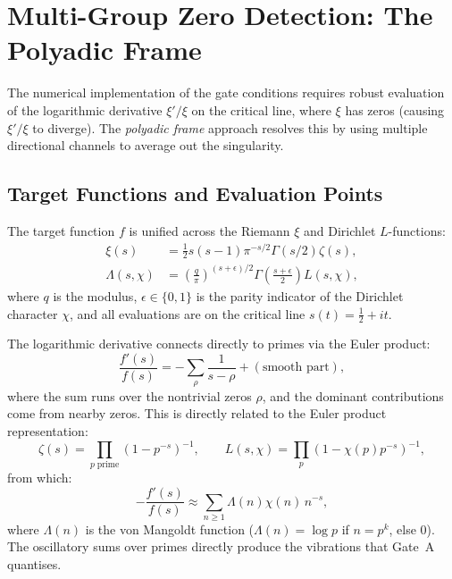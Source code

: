 \documentclass[11pt, a4paper]{article}
\theoremstyle{definition}
\theoremstyle{plain}
\newcommand{\xif}{\xi}                      %
\begin{document}
\section{Multi-Group Zero Detection: The Polyadic Frame}
\label{sec:polyadic}

The numerical implementation of the gate conditions requires robust
evaluation of the logarithmic derivative $\xif'/\xif$ on the critical
line, where $\xif$ has zeros (causing $\xif'/\xif$ to diverge). The
\textit{polyadic frame} approach resolves this by using multiple
directional channels to average out the singularity.

\subsection{Target Functions and Evaluation Points}

The target function $f$ is unified across the Riemann $\xif$ and
Dirichlet $L$-functions:
\begin{align}
  \xif(s) &= \frac{1}{2}s(s-1)\pi^{-s/2}\Gamma(s/2)\zeta(s),
  \label{eq:xi_target}\\
  \Lambda(s, \chi) &= \left(\frac{q}{\pi}\right)^{(s+\epsilon)/2}
  \Gamma\!\left(\frac{s+\epsilon}{2}\right)L(s,\chi),
  \label{eq:lambda_target}
\end{align}
where $q$ is the modulus, $\epsilon \in \{0,1\}$ is the parity indicator
of the Dirichlet character $\chi$, and all evaluations are on the
critical line $s(t) = \tfrac{1}{2} + it$.

The logarithmic derivative connects directly to primes via the Euler
product:
\begin{equation}
  \frac{f'(s)}{f(s)} = -\sum_{\rho}\frac{1}{s-\rho} +
  (\text{smooth part}),
  \label{eq:log_deriv_poles}
\end{equation}
where the sum runs over the nontrivial zeros $\rho$, and the dominant
contributions come from nearby zeros. This is directly related to the
Euler product representation:
\begin{equation}
  \zeta(s) = \prod_{p\;\text{prime}}(1-p^{-s})^{-1}, \qquad
  L(s,\chi) = \prod_p(1-\chi(p)p^{-s})^{-1},
  \label{eq:euler_products}
\end{equation}
from which:
\begin{equation}
  -\frac{f'(s)}{f(s)} \approx \sum_{n \geq 1}
  \Lambda(n)\chi(n)\,n^{-s},
  \label{eq:euler_log_deriv}
\end{equation}
where $\Lambda(n)$ is the von Mangoldt function ($\Lambda(n) = \log p$
if $n = p^k$, else $0$). The oscillatory sums over primes directly
produce the vibrations that Gate~A quantises.
\end{document}
